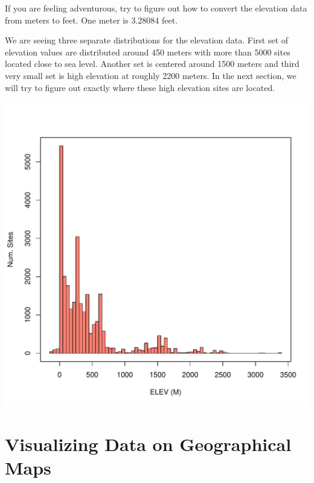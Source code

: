 \documentclass[11pt,twosided]{article}
\begin{document}
If you are feeling adventurous, try to figure out how to convert the elevation data from meters to feet.  One meter is 3.28084 feet.\\

\begin{tcolorbox}[breakable,boxrule=0.5pt,enhanced]
\end{tcolorbox}
\vspace{2ex}

We are seeing three separate distributions for the elevation data.  First set of elevation values are distributed around 450 meters with more than 5000 sites located close to sea level.  Another set is centered around 1500 meters and third very small set is high elevation at roughly 2200 meters.  In the next section, we will try to figure out exactly where these high elevation sites are located.

\begin{center}
\includegraphics[width=6in]{Elevation}
\end{center}


\newpage
\section{Visualizing Data on Geographical Maps}
\end{document}
